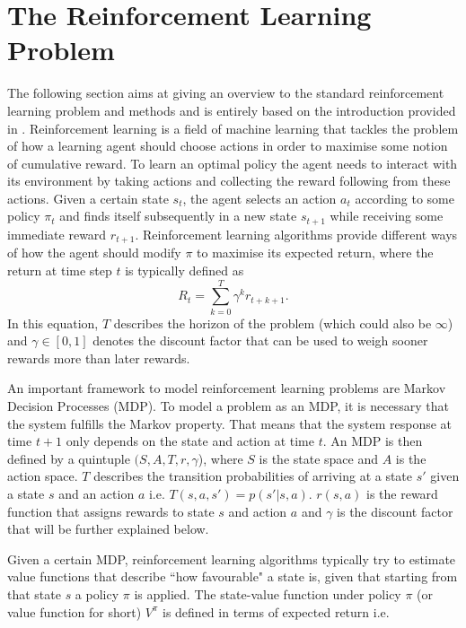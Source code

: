 \documentclass[../main.tex]{subfiles}
\begin{document}
\section{The Reinforcement Learning Problem}\label{sec:RL}
The following section aims at giving an overview to the standard reinforcement learning problem and methods and is entirely based on the introduction provided in \cite{sutton1998reinforcement}.
Reinforcement learning is a field of machine learning that tackles the problem of how a learning agent should choose actions in order to maximise some notion of cumulative reward. To learn an optimal policy the agent needs to interact with its environment by taking actions and collecting the reward following from these actions. Given a certain state $s_t$, the agent selects an action $a_t$ according to some policy $\pi_t$ and finds itself subsequently in a new state $s_{t+1}$ while receiving some immediate reward $r_{t+1}$. Reinforcement learning algorithms provide different ways of how the agent should modify $\pi$ to maximise its expected return, where the return at time step $t$ is typically defined as
\begin{equation}
R_t = \sum_{k=0}^T \gamma^kr_{t+k+1}.
\end{equation}
In this equation, $T$ describes the horizon of the problem (which could also be $\infty$) and $\gamma \in [0,1]$ denotes the discount factor that can be used to weigh sooner rewards more than later rewards.\par
An important framework to model reinforcement learning problems are Markov Decision Processes (MDP). To model a problem as an MDP, it is necessary that the system fulfills the Markov property. That means that the system response at time $t+1$ only depends on the state and action at time $t$. An MDP is then defined by a quintuple $(S,A,T,r,\gamma$), where $S$ is the state space and $A$ is the action space. $T$ describes the transition probabilities of arriving at a state $s'$ given a state $s$ and an action $a$ i.e. $T(s,a,s') = p(s'|s,a)$. $r(s,a)$ is the reward function that assigns rewards to state $s$ and action $a$ and $\gamma$ is the discount factor that will be further explained below. \par
Given a certain MDP, reinforcement learning algorithms typically try to estimate value functions that describe ``how favourable" a state is, given that starting from that state $s$ a policy $\pi$ is applied. The state-value function under policy $\pi$ (or value function for short) $V^\pi$ is defined in terms of expected return i.e.
\end{document}
